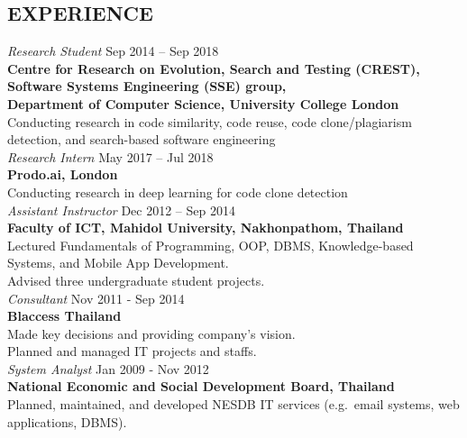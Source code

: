 \documentclass[margin, 10pt]{res} %
\begin{document}
\begin{resume}
\newpage
 
\section{EXPERIENCE}

{\sl Research Student} \hfill Sep 2014 -- Sep 2018 \\
\textbf{Centre for Research on Evolution, Search and Testing (CREST), \\ Software Systems Engineering (SSE) group, \\ Department of Computer Science, University College London}\\
Conducting research in code similarity, code reuse, code clone/plagiarism detection, and search-based software engineering \vspace{4mm} \\
{\sl Research Intern} \hfill May 2017 -- Jul 2018 \\
\textbf{Prodo.ai, London}\\
Conducting research in deep learning for code clone detection 
\vspace{4mm} \\
{\sl Assistant Instructor} \hfill Dec 2012 -- Sep 2014 \\
\textbf{Faculty of ICT, Mahidol University, Nakhonpathom, Thailand} \\
Lectured Fundamentals of Programming, OOP, DBMS, Knowledge-based Systems, and Mobile App Development. \\
Advised three undergraduate student projects. \vspace{3mm} \\
{\sl Consultant} \hfill Nov 2011 - Sep 2014 \\
\textbf{Blaccess Thailand} \\
Made key decisions and providing company's vision. \\
Planned and managed IT projects and staffs. \vspace{3mm} \\
{\sl System Analyst} \hfill Jan 2009 - Nov 2012\\
\textbf{National Economic and Social Development Board, Thailand}\\
Planned, maintained, and developed NESDB IT services (e.g.~email systems, web applications, DBMS).\\

\end{resume}
\end{document}
